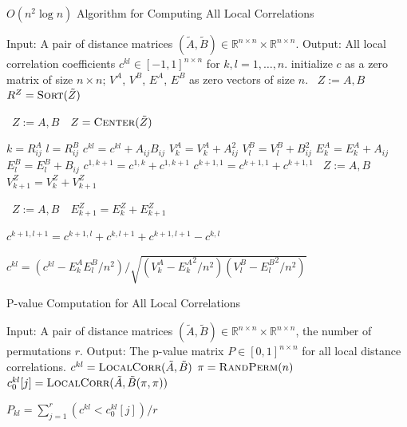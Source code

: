\documentclass[11pt]{article}
\newcommand{\Real}{\mathbb{R}}
\newcommand{\G}{c}
\newcommand{\Linefor}[2]{%
    \State \algorithmicfor\ {#1}\ \algorithmicdo\ {#2} \algorithmicend\ \algorithmicfor%
}
\begin{document}
\begin{algorithm}
\caption{$O(n^2 \log n)$ Algorithm for Computing All Local Correlations}
\label{alg:all_scales}
\begin{algorithmic}[1]
\Statex Input: A pair of distance matrices $(\tilde{A},\tilde{B}) \in \Real^{n \times n} \times \Real^{n \times n}$.
\Statex Output: All local correlation coefficients $\G^{kl} \in [-1,1]^{n \times n}$ for $k,l=1,\ldots,n$.
\State initialize $\G$ as a zero matrix of size $n \times n$; $V^{A}$, $V^{B}$, $E^{A}$, $E^{B}$ as zero vectors of size $n$.
\Linefor{$Z:=A,B$}{$R^{Z}=\textsc{Sort}(\tilde{Z})$}
\Linefor{$Z:=A,B$}{$Z=\textsc{Center}(\tilde{Z})$}
\State $k=R^{A}_{ij}$
\State $l=R^{B}_{ij}$
\State $\G^{kl}=\G^{kl}+A_{ij}B_{ij}$
\State $V^{A}_{k}=V^{A}_{k}+A_{ij}^2$
\State $V^{B}_{l}=V^{B}_{l}+B_{ij}^2$
\State $E^{A}_{k}=E^{A}_{k}+A_{ij}$
\State $E^{B}_{l}=E^{B}_{l}+B_{ij}$
\EndFor
\Statex {}
\State $\G^{1, k+1}=\G^{1, k}+\G^{1, k+1}$
\State $\G^{k+1,1}=\G^{k+1,1}+\G^{k+1,1}$
\Linefor{$Z:=A,B$}{$V^{Z}_{k+1}=V^{Z}_{k}+V^{Z}_{k+1}$}
\Linefor{$Z:=A,B$}{$E^{Z}_{k+1}=E^{Z}_{k}+E^{Z}_{k+1}$}
\EndFor

\State $\G^{k+1,l+1}=\G^{k+1,l}+\G^{k,l+1}+\G^{k+1,l+1}-\G^{k,l}$
\EndFor

 
\State $\G^{kl}=\left(\G^{kl}-E^{A}_{k}E^{B}_{l}/n^2\right)/\sqrt{\left(V^{A}_{k}-{E^{A}_{k}}^2/n^2\right) \left(V^{B}_{l}-{E^{B}_{l}}^2/n^2\right)}$
\EndFor
\EndFunction
\end{algorithmic}
\end{algorithm}

\begin{algorithm}
\caption{P-value Computation for All Local Correlations}
\label{alg:pval}
\begin{algorithmic}[1]
\Statex Input: A pair of distance matrices $(\tilde{A},\tilde{B}) \in \Real^{n \times n} \times \Real^{n \times n}$, the number of permutations $r$.
\Statex Output: The p-value matrix $P \in [0,1]^{n \times n}$ for all local distance correlations.
\State $\G^{kl}=\textsc{LocalCorr}(\tilde{A},\tilde{B})$ 
\State $\pi=\textsc{RandPerm}(n)$ 
\State $\G^{kl}_{0}[j]=\textsc{LocalCorr}(\tilde{A},\tilde{B}(\pi,\pi))$ 
\EndFor

\State $P_{kl}=\sum_{j=1}^{r}(\G^{kl}<\G^{kl}_{0}[j])/r$ 
\EndFor
\EndFunction
\end{algorithmic}
\end{algorithm}
\end{document}
